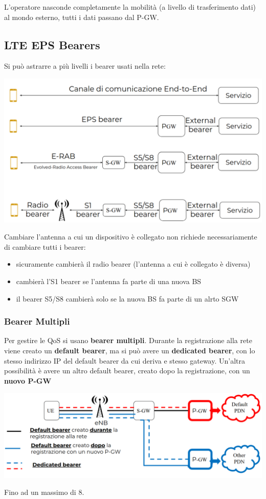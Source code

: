 L'operatore nasconde completamente la mobilità (a livello di trasferimento dati) al mondo esterno, tutti i dati passano dal P-GW.\\

\subsection{LTE EPS Bearers}

Si può astrarre a più livelli i bearer usati nella rete:

\begin{center}
	\includegraphics[width=0.85\linewidth]{img/4g/bearing}
\end{center}

Cambiare l'antenna a cui un dispositivo è collegato non richiede necessariamente di cambiare tutti i bearer: 
\begin{itemize}
	\item sicuramente cambierà il radio bearer (l'antenna a cui è collegato è diversa)
	\item cambierà l'S1 bearer se l'antenna fa parte di una nuova BS
	\item il bearer S5/S8 cambierà solo se la nuova BS fa parte di un alrto SGW
\end{itemize}

\newpage

\subsubsection{Bearer Multipli} 

Per gestire le QoS si usano \textbf{bearer multipli}. Durante la registrazione alla rete viene creato un \textbf{default bearer}, ma si può avere un \textbf{dedicated bearer}, con lo stesso indirizzo IP del default bearer da cui deriva e stesso gateway. Un'altra possibilità è avere un altro default bearer, creato dopo la registrazione, con un \textbf{nuovo P-GW}
\begin{center}
	\includegraphics[width=\linewidth]{img/4g/dedicatedbearing}
\end{center}
Fino ad un massimo di 8. \\

